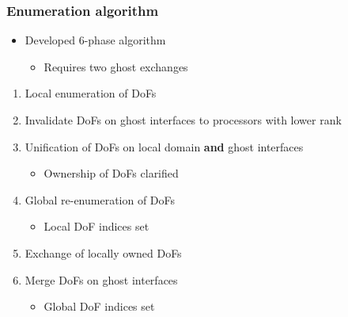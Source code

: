 \begin{frame}
\frametitle{Enumeration algorithm}

\begin{itemize}
\item Developed 6-phase algorithm
  \begin{itemize}
  \item Requires two ghost exchanges
  \end{itemize}
\end{itemize}

\vfill{}

\begin{enumerate}
  \item Local enumeration of DoFs
  \item Invalidate DoFs on ghost interfaces to processors with lower rank
  \item Unification of DoFs on local domain \textbf{and} ghost interfaces
  \begin{itemize}
    \item Ownership of DoFs clarified
  \end{itemize}
  \item Global re-enumeration of DoFs
  \begin{itemize}
    \item Local DoF indices set
  \end{itemize}
  \item Exchange of locally owned DoFs
  \item Merge DoFs on ghost interfaces
  \begin{itemize}
    \item Global DoF indices set
  \end{itemize}
\end{enumerate}
\end{frame}




